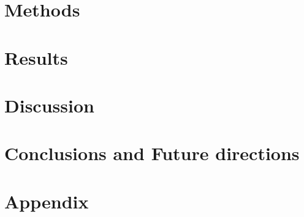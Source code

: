 \documentclass{article}
\begin{document}
\section{Methods}



\section{Results}



\section{Discussion}

%

\section{Conclusions and Future directions}

%

\newpage 



\newpage 
\section{Appendix}

%
\end{document}

